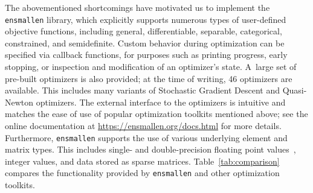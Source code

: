 \documentclass[twoside,11pt]{article}
\begin{document}

The abovementioned shortcomings have motivated us to implement the {\tt ensmallen} library,
which explicitly supports numerous types of user-defined objective functions,
including general, differentiable, separable, categorical, constrained, and semidefinite.
Custom behavior during optimization can be specified via {callback} functions,
for purposes such as printing progress, early stopping, or inspection and modification of an optimizer's state.
A~large set of pre-built optimizers is also provided;
at the time of writing, 46 optimizers are available.
This includes many variants of Stochastic Gradient Descent and Quasi-Newton optimizers.
The external interface to the optimizers is intuitive
and matches the ease of use of popular
optimization toolkits mentioned above;
see the online documentation at \mbox{\url{https://ensmallen.org/docs.html}} for more details.
Furthermore, {\tt ensmallen} supports the use of various underlying element and matrix types.
This includes single- and double-precision floating point values~\citep{Goldberg_CSUR_1991}, 
integer values, and data stored as sparse matrices.
Table~\ref{tab:comparison} compares the functionality provided
by {\tt ensmallen} and other optimization toolkits.
\end{document}
